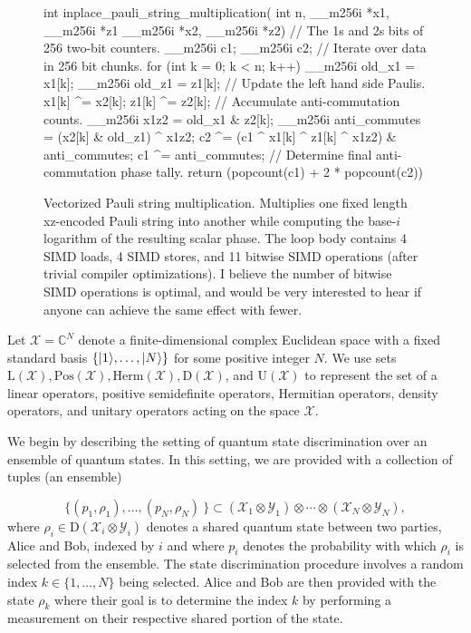 \documentclass[11pt]{article}
\theoremstyle{definition}
\newcommand{\microspace}{\mspace{0.5mu}}
\newcommand{\ket}[1]{
  \lvert\microspace #1 \microspace \rangle}
\newcommand{\setft}[1]{\mathrm{#1}}
\newcommand{\Density}{\setft{D}}
\newcommand{\Pos}{\setft{Pos}}
\newcommand{\Unitary}{\setft{U}}
\newcommand{\Herm}{\setft{Herm}}
\newcommand{\Lin}{\setft{L}}
\newcommand{\complex}{\mathbb{C}}
\newcommand{\X}{\mathcal{X}}
\newcommand{\Y}{\mathcal{Y}}
\begin{document}
\begin{figure}
    \centering
\begin{cpp}
    int inplace_pauli_string_multiplication(
            int n, __m256i *x1, __m256i *z1 __m256i *x2, __m256i *z2) {
        // The 1s and 2s bits of 256 two-bit counters.
        __m256i c1{};
        __m256i c2{};
        // Iterate over data in 256 bit chunks.
        for (int k = 0; k < n; k++) {
            __m256i old_x1 = x1[k];
            __m256i old_z1 = z1[k];
            // Update the left hand side Paulis.
            x1[k] ^= x2[k];
            z1[k] ^= z2[k];
            // Accumulate anti-commutation counts.
            __m256i x1z2 = old_x1 & z2[k];
            __m256i anti_commutes = (x2[k] & old_z1) ^ x1z2;
            c2 ^= (c1 ^ x1[k] ^ z1[k] ^ x1z2) & anti_commutes;
            c1 ^= anti_commutes;
        }
        // Determine final anti-commutation phase tally.
        return (popcount(c1) + 2 * popcount(c2)) %
    }
\end{cpp}
    \caption{
        Vectorized Pauli string multiplication.
        Multiplies one fixed length xz-encoded Pauli string into another while computing the base-$i$ logarithm of the resulting scalar phase.
        The loop body contains 4 SIMD loads, 4 SIMD stores, and 11 bitwise SIMD operations (after trivial compiler optimizations).
        I believe the number of bitwise SIMD operations is optimal, and would be very interested to hear if anyone can achieve the same effect with fewer.
    }
    \label{fig:pauli_mult_code}
\end{figure}

Let $\X = \complex^N$ denote a finite-dimensional complex Euclidean space with
a fixed standard basis $\{\ket{1}, \ldots, \ket{N} \}$ for some positive
integer $N$. We use sets $\Lin(\X), \Pos(\X), \Herm(\X), \Density(\X)$, and
$\Unitary(\X)$ to represent the set of a linear operators, positive
semidefinite operators, Hermitian operators, density operators, and unitary
operators acting on the space $\X$.

We begin by describing the setting of quantum state discrimination over an
ensemble of quantum states. In this setting, we are provided with a collection
of tuples (an ensemble)

\begin{equation}
    \{(p_1, \rho_1), \ldots, (p_N, \rho_N) \ \} \subset 
    (\X_1 \otimes \Y_1) \otimes \cdots \otimes (\X_N \otimes \Y_N),
\end{equation}
where $\rho_i \in \Density(\X_i \otimes \Y_i)$ denotes a shared quantum state
between two parties, Alice and Bob, indexed by $i$ and where $p_i$ denotes the
probability with which $\rho_i$ is selected from the ensemble. The state
discrimination procedure involves a random index $k \in \{1, \ldots, N\}$ being
selected. Alice and Bob are then provided with the state $\rho_k$ where their
goal is to determine the index $k$ by performing a measurement on their
respective shared portion of the state. 
\end{document}
